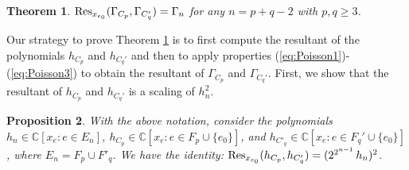 \documentclass[a4paper, 11pt, twoside]{article}
\theoremstyle{plain}
\newtheorem{theorem}{Theorem}[section]
\newtheorem{proposition}[theorem]{Proposition}
\begin{document}
\begin{theorem} \label{thm:resultant}
${\rm Res}_{x_{e_0}}(\Gamma_{C_p}, \Gamma_{C_q'}) =  \Gamma_n$ for any $n=p+q-2$ with $p,q\ge 3$.
\end{theorem}

Our strategy to prove Theorem \ref{thm:resultant} is to first compute the resultant of the polynomials $h_{C_p}$ and $h_{C_q'}$ and then to apply properties (\ref{eq:Poisson1})-(\ref{eq:Poisson3}) to obtain the resultant of $\Gamma_{C_p}$ and $\Gamma_{C_q'}$. First, we show that the resultant of $h_{C_p}$ and $h_{C_q'}$ is a scaling of $h_n^2$. 

\begin{proposition} \label{prop:Resh}
With the above notation, consider the polynomials $h_n \in \mathbb{C}[x_e  :  e \in E_n]$, $h_{C_p} \in \mathbb{C}[x_e : e \in F_p\cup\{e_0\}]$, and $h_{C'_q} \in \mathbb{C}[x_e  :  e \in F_q'\cup\{e_0\}]$,  where $E_n=F_p\cup F'_q$. 
We have the identity: ${\rm Res}_{x_{e_0}}(h_{C_p}, h_{C'_q}) = (2^{2^{n-1}} \, h_n)^2$. 
\end{proposition}
\end{document}
